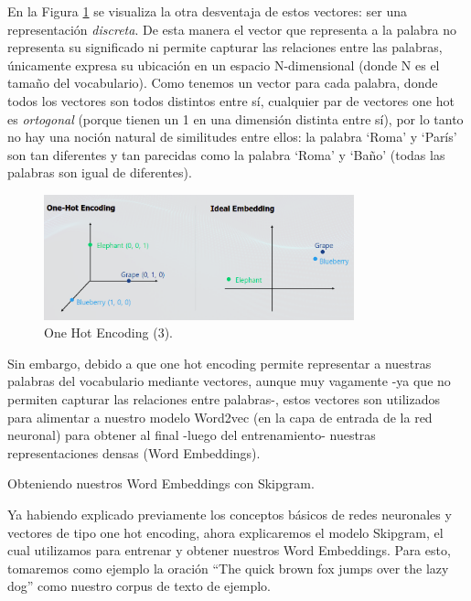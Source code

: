 \documentclass[12pt,a4paper]{article}
\makeatletter
\renewcommand\paragraph{\@startsection{paragraph}{4}{\z@}
            {-2.5ex\@plus -1ex \@minus -.25ex}
            {1.25ex \@plus .25ex}
            {\normalfont\normalsize\bfseries}}
\makeatother
\begin{document}
\begin{sloppypar}
En la Figura \ref{fig:Imagen_NLP_18} se visualiza la otra desventaja de estos vectores: ser una representación \textit{discreta}. De esta manera el vector que representa a la palabra no representa su significado ni permite capturar las relaciones entre las palabras, únicamente expresa su ubicación en un espacio N-dimensional (donde N es el tamaño del vocabulario). Como tenemos un vector para cada palabra, donde todos los vectores son todos distintos entre sí, cualquier par de vectores one hot es \textit{ortogonal} (porque tienen un 1 en una dimensión distinta entre sí), por lo tanto no hay una noción natural de similitudes entre ellos: la palabra ‘Roma’ y ‘París’ son tan diferentes y tan parecidas como la palabra ‘Roma’ y ‘Baño’ (todas las palabras son igual de diferentes). 

\begin{figure}[H]    
 \centering
 \includegraphics[width=0.8\textwidth]{images/NLP/18.png}
 \caption{One Hot Encoding (3)\cite{NLP_28}.}
 \label{fig:Imagen_NLP_18}
\end{figure}

Sin embargo, debido a que one hot encoding permite representar a nuestras palabras del vocabulario mediante vectores, aunque muy vagamente -ya que no permiten capturar las relaciones entre palabras-, estos vectores son utilizados para alimentar a nuestro modelo Word2vec (en la capa de entrada de la red neuronal) para obtener al final -luego del entrenamiento- nuestras representaciones densas (Word Embeddings).

\cleardoublepage

\paragraph{Obteniendo nuestros Word Embeddings con Skipgram.}\label{obt_skip}

Ya habiendo explicado previamente los conceptos básicos de redes neuronales y vectores de tipo one hot encoding, ahora explicaremos el modelo Skipgram, el cual utilizamos para entrenar y obtener nuestros Word Embeddings. Para esto, tomaremos como ejemplo la oración “The quick brown fox jumps over the lazy dog” como nuestro corpus de texto de ejemplo.


\end{sloppypar}
\end{document}
